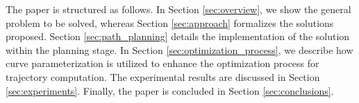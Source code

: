 The paper is structured as follows. In Section \ref{sec:overview}, we show the general problem to be solved, whereas Section \ref{sec:approach} formalizes the solutions proposed. Section \ref{sec:path_planning} details the implementation of the solution within the planning stage. In Section \ref{sec:optimization_process}, we describe how curve parameterization is utilized to enhance the optimization process for trajectory computation. The experimental results are discussed in Section \ref{sec:experiments}. Finally, the paper is concluded in Section \ref{sec:conclusions}.
